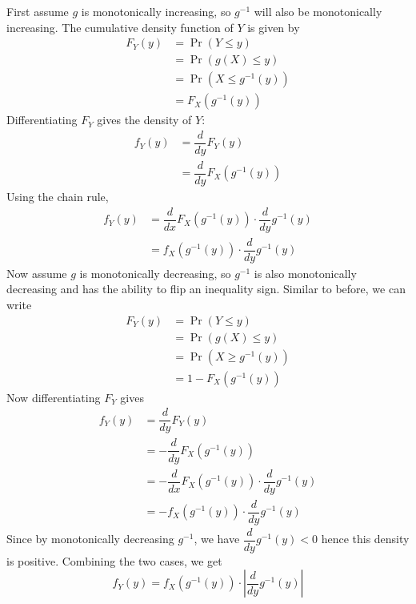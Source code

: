 \documentclass[11pt]{report} %
\begin{document}
First assume $g$ is monotonically increasing, so $g^{-1}$ will also be monotonically increasing. The cumulative density function of $Y$ is given by
\begin{align}
F_{Y}\left(y\right) &= \operatorname{Pr}\left(Y \leq y\right) \\
&= \operatorname{Pr}\left(g\left(X\right) \leq y\right) \\
&= \operatorname{Pr}\left(X \leq g^{-1}\left(y\right)\right) \\
&= F_{X}\left(g^{-1}\left(y\right)\right)
\end{align}
Differentiating $F_{Y}$ gives the density of $Y$:
\begin{align}
f_{Y}\left(y\right) &= \dfrac{d}{dy}F_{Y}\left(y\right)\\
&= \dfrac{d}{dy}F_{X}\left(g^{-1}\left(y\right)\right)
\end{align}
Using the chain rule,
\begin{align}
f_{Y}\left(y\right) &= \dfrac{d}{dx}F_{X}\left(g^{-1}\left(y\right)\right)\cdot\dfrac{d}{dy}g^{-1}\left(y\right) \\
&= f_{X}\left(g^{-1}\left(y\right)\right)\cdot\dfrac{d}{dy}g^{-1}\left(y\right)
\end{align}
Now assume $g$ is monotonically decreasing, so $g^{-1}$ is also monotonically decreasing and has the ability to flip an inequality sign. Similar to before, we can write
\begin{align}
F_{Y}\left(y\right) &= \operatorname{Pr}\left(Y \leq y\right) \\
&= \operatorname{Pr}\left(g\left(X\right) \leq y\right) \\
&= \operatorname{Pr}\left(X \geq g^{-1}\left(y\right)\right) \\
&= 1 - F_{X}\left(g^{-1}\left(y\right)\right)
\end{align}
Now differentiating $F_{Y}$ gives 
\begin{align}
f_{Y}\left(y\right) &= \dfrac{d}{dy}F_{Y}\left(y\right) \\
&= -\dfrac{d}{dy}F_{X}\left(g^{-1}\left(y\right)\right) \\
&= -\dfrac{d}{dx}F_{X}\left(g^{-1}\left(y\right)\right)\cdot\dfrac{d}{dy}g^{-1}\left(y\right) \\
&= -f_{X}\left(g^{-1}\left(y\right)\right)\cdot\dfrac{d}{dy}g^{-1}\left(y\right)
\end{align}
Since by monotonically decreasing $g^{-1}$, we have $\dfrac{d}{dy}g^{-1}\left(y\right) < 0$ hence this density is positive. Combining the two cases, we get
\begin{equation}
f_{Y}\left(y\right) =  f_{X}\left(g^{-1}\left(y\right)\right)\cdot\left|\dfrac{d}{dy}g^{-1}\left(y\right)\right|
\end{equation}
\end{document}
